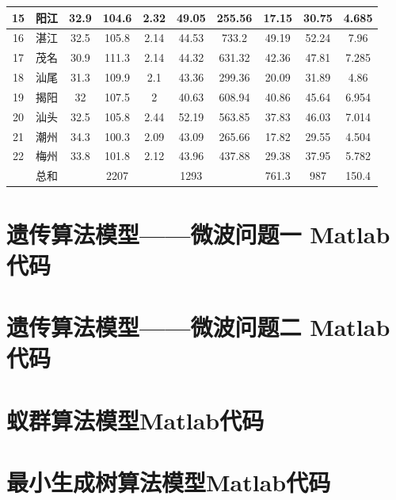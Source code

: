 \documentclass[UTF8,12pt]{ctexart}
\begin{document}
\begin{appendices}
\begin{table}[H]
\begin{tabular}{cccccccccc}
          \midrule
          15     & 阳江     & 32.9   & 104.6  & 2.32   & 49.05  & 255.56 & 17.15  & 30.75  & 4.685 \\
          \midrule
          16     & 湛江     & 32.5   & 105.8  & 2.14   & 44.53  & 733.2  & 49.19  & 52.24  & 7.96 \\
          \midrule
          17     & 茂名     & 30.9   & 111.3  & 2.14   & 44.32  & 631.32 & 42.36  & 47.81  & 7.285 \\
          \midrule
          18     & 汕尾     & 31.3   & 109.9  & 2.1    & 43.36  & 299.36 & 20.09  & 31.89  & 4.86 \\
          \midrule
          19     & 揭阳     & 32     & 107.5  & 2      & 40.63  & 608.94 & 40.86  & 45.64  & 6.954 \\
          \midrule
          20     & 汕头     & 32.5   & 105.8  & 2.44   & 52.19  & 563.85 & 37.83  & 46.03  & 7.014 \\
          \midrule
          21     & 潮州     & 34.3   & 100.3  & 2.09   & 43.09  & 265.66 & 17.82  & 29.55  & 4.504 \\
          \midrule
          22     & 梅州     & 33.8   & 101.8  & 2.12   & 43.96  & 437.88 & 29.38  & 37.95  & 5.782 \\
          \midrule
                 & 总和     &        & 2207   &        & 1293   &        & 761.3  & 987    & 150.4 \\
          \bottomrule
          \end{tabular}%
      \end{table}%

    

    
    \section{遗传算法模型——微波问题一 Matlab代码}
    \section{遗传算法模型——微波问题二 Matlab代码}
    \section{蚁群算法模型Matlab代码}
    \section{最小生成树算法模型Matlab代码}
\end{appendices} 
\end{document}

